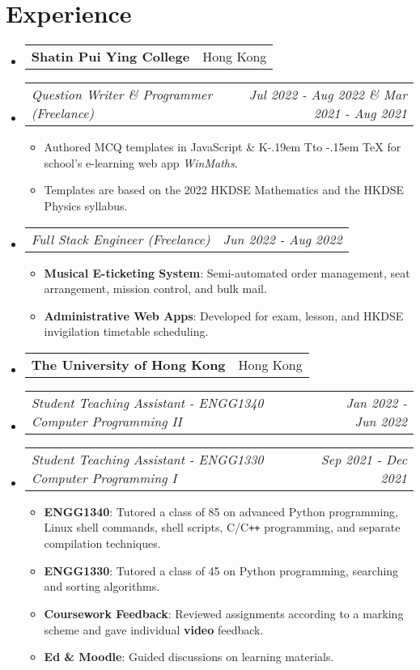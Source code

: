 \documentclass[a4paper,20pt]{article}
\makeatletter
\newcommand{\companyTitle}[2]{
  \item
    \begin{tabular*}{0.97\textwidth}{l@{\extracolsep{\fill}}r}
      \textbf{#1} & #2 \\
    \end{tabular*}\vspace{-4pt}
}
\newcommand{\jobTitle}[2]{
  \item[]
    \begin{tabular*}{0.97\textwidth}{l@{\extracolsep{\fill}}r}
      \textit{#1} & \textit{#2} \\
    \end{tabular*}\vspace{-4pt}
}
\newcommand{\jobItem}[2]{
  \item\small{
    \textbf{#1}{: #2}
  }
}
\DeclareRobustCommand{\KaTeX}{%
  K\kern -.19em
  {\sbox \z@ T\vbox to\ht \z@ {\hbox{%
  \check@mathfonts
  \fontsize\sf@size\z@
  \selectfont A}%
  \vss}%
}\kern -.15em
\TeX}
\makeatother
\begin{document}
\section{Experience}
\begin{itemize}[leftmargin=*]
   
    \companyTitle{Shatin Pui Ying College}{Hong Kong}
        
    \jobTitle{Question Writer \& Programmer (Freelance)}{Jul 2022 - Aug 2022 \& Mar 2021 - Aug 2021}
    \begin{itemize}
        \item \small Authored MCQ templates in JavaScript \& {\KaTeX} for school's e-learning web app \textit{WinMaths}.
            \item \small Templates are based on the 2022 HKDSE Mathematics and the HKDSE Physics syllabus.
    \end{itemize}
        
    \jobTitle{Full Stack Engineer (Freelance)}{Jun 2022 - Aug 2022}
    \begin{itemize}
        \jobItem{Musical E-ticketing System}{Semi-automated order management, seat arrangement, mission control, and bulk mail.}
        \jobItem{Administrative Web Apps}{Developed for exam, lesson, and HKDSE invigilation timetable scheduling.}
    \end{itemize}
        
    \companyTitle{The University of Hong Kong}{Hong Kong}
        
    \jobTitle{Student Teaching Assistant - ENGG1340 Computer Programming II}{Jan 2022 - Jun 2022}
    \jobTitle{Student Teaching Assistant - ENGG1330 Computer Programming I}{Sep 2021 - Dec 2021}
    \begin{itemize}
        \jobItem{ENGG1340}{Tutored a class of 85 on advanced Python programming, Linux shell commands, shell scripts, C/C\texttt{++} programming, and separate compilation techniques.}
        \jobItem{ENGG1330}{Tutored a class of 45 on Python programming, searching and sorting algorithms.}
        \jobItem{Coursework Feedback}{Reviewed assignments according to a marking scheme and gave individual \textbf{video} feedback.}
        \jobItem{Ed \& Moodle}{Guided discussions on learning materials.}
    \end{itemize}
  
\end{itemize}

\vspace{-2pt}
\end{document}

